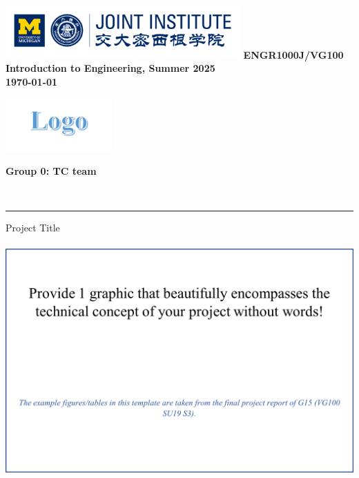 \documentclass{engr1000j-s2}
\begin{document}
  \thispagestyle{firstpage}
  \includegraphics[height=0.8in]{figures/headlogo.png}
  \newline
  \textbf{\Large ENGR1000J/VG100 Introduction to Engineering, Summer 2025}\\[0.5em]
  \textbf{{\Large \today}}

  \begin{center}

    \begin{minipage}{0.45\textwidth}
      \includegraphics[height=0.8in]{figures/team logo.png}
    \end{minipage}\hfill
    \begin{minipage}{0.45\textwidth}
      \textbf{\Large Group 0: TC team}
    \end{minipage}\\[0.2em]
  \end{center}

  \noindent
  {\color{gray!30}\rule{\textwidth}{0.1pt}}

  {\Huge Project Title}

  \begin{center}
    \includegraphics[height=3.5in]{figures/preface_picture.png}
  \end{center}
\end{document}
